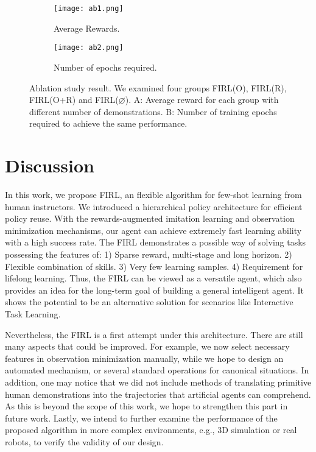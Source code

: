 \documentclass[conference]{IEEEtran}
\begin{document}
\begin{figure}[h]
     \centering
     \begin{subfigure}{0.9\linewidth}
         \centering
         \texttt{[image: ab1.png]}
         \caption{Average Rewards.}
         \label{fig:abla_rews}
     \end{subfigure}
     \hfill
     \begin{subfigure}{0.9\linewidth}
         \centering
         \texttt{[image: ab2.png]}  
         \caption{Number of epochs required.}
         \label{fig:abla_epoch}
     \end{subfigure}
     \hfill
        \caption{Ablation study result. We examined four groups FIRL(O), FIRL(R), FIRL(O+R) and FIRL(\(\varnothing\)). A: Average reward for each group with different number of demonstrations. B: Number of training epochs required to achieve the same performance.}
\label{fig:ablation_al}
\end{figure}


\section{Discussion}
In this work, we propose FIRL, an flexible algorithm for few-shot learning from human instructors. We introduced a hierarchical policy architecture for efficient policy reuse. With the rewards-augmented imitation
learning and observation minimization mechanisms, our agent can achieve extremely fast learning ability with a high success rate. The FIRL demonstrates a possible way of solving tasks possessing the features of: 1) Sparse reward, multi-stage and 
long horizon. 2) Flexible combination of skills. 3) Very few learning samples. 4) Requirement for lifelong learning. Thus, the FIRL can be viewed as a versatile agent, which also provides an idea for the long-term goal of building a general intelligent agent. It shows the potential to be an alternative solution for scenarios like Interactive Task Learning. 

Nevertheless, the FIRL is a first attempt under this architecture. There are still many aspects that could be improved. For example, we now select necessary features in observation minimization manually, while we hope to design an automated mechanism, or several standard operations for canonical situations. In addition, one may notice that we did not include methods of translating primitive human demonstrations into the trajectories that artificial agents can comprehend. As this is beyond the scope of this work, we hope to strengthen this part in future work. Lastly, we intend to further examine the performance of the proposed algorithm in more complex environments, e.g., 3D simulation or real robots, to verify
the validity of our design.



\end{document}
